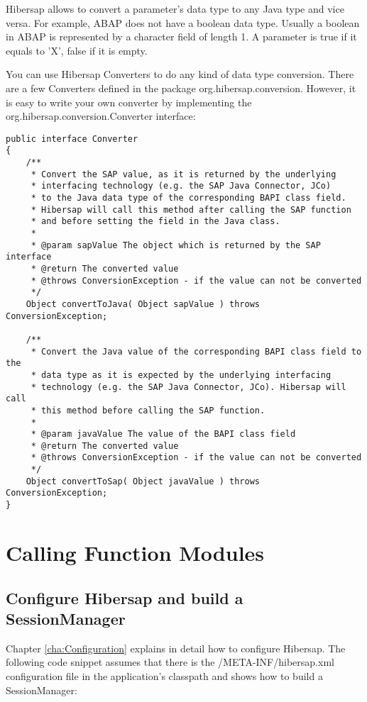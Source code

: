 Hibersap allows to convert a parameter's data type to any Java type and vice versa. For example, ABAP does not have a boolean data type. Usually a boolean in ABAP is represented by a character field of length 1. A parameter is true if it equals to 'X', false if it is empty.

You can use Hibersap Converters to do any kind of data type conversion. There are a few Converters defined in the package org.hibersap.conversion. However, it is easy to write your own converter by implementing the org.hibersap.conversion.Converter interface:

\begin{lstlisting}[caption=The Converter interface]
public interface Converter
{
    /**
     * Convert the SAP value, as it is returned by the underlying 
     * interfacing technology (e.g. the SAP Java Connector, JCo) 
     * to the Java data type of the corresponding BAPI class field. 
     * Hibersap will call this method after calling the SAP function
     * and before setting the field in the Java class.
     * 
     * @param sapValue The object which is returned by the SAP interface
     * @return The converted value
     * @throws ConversionException - if the value can not be converted
     */
    Object convertToJava( Object sapValue ) throws ConversionException;

    /**
     * Convert the Java value of the corresponding BAPI class field to the 
     * data type as it is expected by the underlying interfacing 
     * technology (e.g. the SAP Java Connector, JCo). Hibersap will call 
     * this method before calling the SAP function.
     * 
     * @param javaValue The value of the BAPI class field
     * @return The converted value
     * @throws ConversionException - if the value can not be converted
     */
    Object convertToSap( Object javaValue ) throws ConversionException;
}
\end{lstlisting}

\section{Calling Function Modules}

\subsection{Configure Hibersap and build a SessionManager}
Chapter \ref{cha:Configuration} explains in detail how to configure Hibersap. The following code snippet assumes that there is the /META-INF/hibersap.xml configuration file in the application's classpath and shows how to build a SessionManager:


